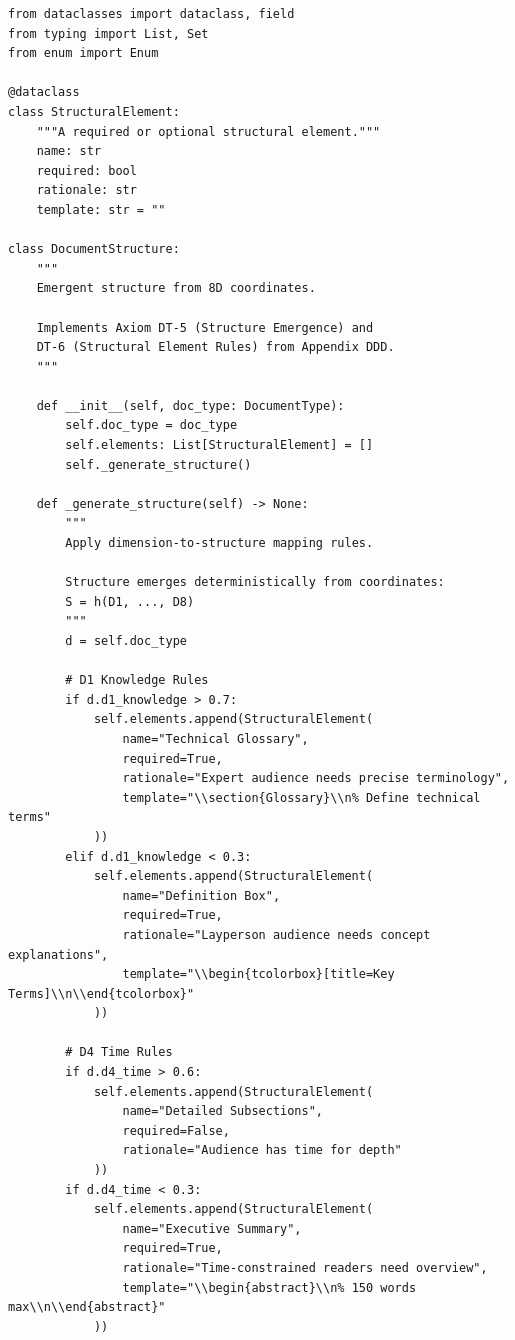 \begin{verbatim}
from dataclasses import dataclass, field
from typing import List, Set
from enum import Enum

@dataclass
class StructuralElement:
    """A required or optional structural element."""
    name: str
    required: bool
    rationale: str
    template: str = ""

class DocumentStructure:
    """
    Emergent structure from 8D coordinates.

    Implements Axiom DT-5 (Structure Emergence) and
    DT-6 (Structural Element Rules) from Appendix DDD.
    """

    def __init__(self, doc_type: DocumentType):
        self.doc_type = doc_type
        self.elements: List[StructuralElement] = []
        self._generate_structure()

    def _generate_structure(self) -> None:
        """
        Apply dimension-to-structure mapping rules.

        Structure emerges deterministically from coordinates:
        S = h(D1, ..., D8)
        """
        d = self.doc_type

        # D1 Knowledge Rules
        if d.d1_knowledge > 0.7:
            self.elements.append(StructuralElement(
                name="Technical Glossary",
                required=True,
                rationale="Expert audience needs precise terminology",
                template="\\section{Glossary}\\n% Define technical terms"
            ))
        elif d.d1_knowledge < 0.3:
            self.elements.append(StructuralElement(
                name="Definition Box",
                required=True,
                rationale="Layperson audience needs concept explanations",
                template="\\begin{tcolorbox}[title=Key Terms]\\n\\end{tcolorbox}"
            ))

        # D4 Time Rules
        if d.d4_time > 0.6:
            self.elements.append(StructuralElement(
                name="Detailed Subsections",
                required=False,
                rationale="Audience has time for depth"
            ))
        if d.d4_time < 0.3:
            self.elements.append(StructuralElement(
                name="Executive Summary",
                required=True,
                rationale="Time-constrained readers need overview",
                template="\\begin{abstract}\\n% 150 words max\\n\\end{abstract}"
            ))


\end{verbatim}
